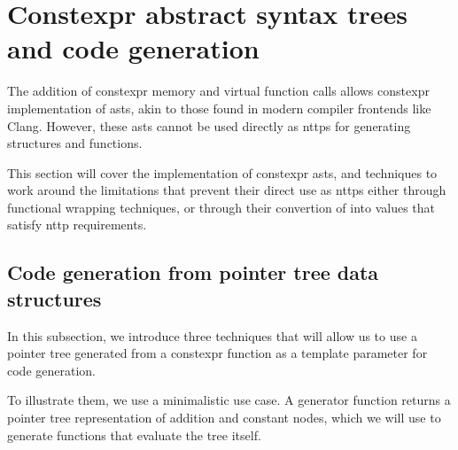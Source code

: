 \documentclass[../main]{subfiles}
\begin{document}
\section{
  Constexpr abstract syntax trees and code generation
}
\label{lbl:ast-codegen}

The addition of \gls{constexpr} memory and virtual function calls allows
\gls{constexpr} implementation of \glspl{ast}, akin to those found
in modern \cpp compiler frontends like Clang.
However, these \glspl{ast} cannot be used directly as \glspl{nttp}
for generating structures and functions.

This section will cover the implementation of \gls{constexpr} \glspl{ast},
and techniques to work around the limitations that prevent their direct use as
\glspl{nttp} either through functional wrapping techniques, or through
their convertion of into values that satisfy \gls{nttp} requirements.

\subsection{
  Code generation from pointer tree data structures
}

\label{lbl:ptr-tree-codegen}

In this subsection, we introduce three techniques that will allow us to use
a pointer tree generated from a \gls{constexpr} function as a template parameter
for code generation.

To illustrate them, we use a minimalistic use case.
A generator function returns a pointer tree representation of addition and
constant nodes, which we will use to generate functions that evaluate
the tree itself.
\end{document}
